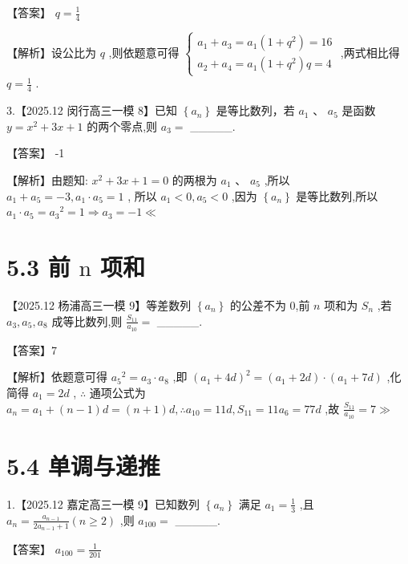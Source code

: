 \documentclass[10pt]{article}
\begin{document}
【答案】 \(q = \frac{1}{4}\)

【解析】设公比为 \(q\) ,则依题意可得 \(\left\{  \begin{array}{l} {a}_{1} + {a}_{3} = {a}_{1}\left( {1 + {q}^{2}}\right)  = {16} \\  {a}_{2} + {a}_{4} = {a}_{1}\left( {1 + {q}^{2}}\right) q = 4 \end{array}\right.\) ,两式相比得 \(q = \frac{1}{4}\) .

3.【2025.12 闵行高三一模 8】已知 \(\left\{  {a}_{n}\right\}\) 是等比数列，若 \({a}_{1}\) 、 \({a}_{5}\) 是函数 \(y = {x}^{2} + {3x} + 1\) 的两个零点,则 \({a}_{3} =\) \_\_\_\_\_.

【答案】 -1

【解析】由题知: \({x}^{2} + {3x} + 1 = 0\) 的两根为 \({a}_{1}\text{ 、 }{a}_{5}\) ,所以 \({a}_{1} + {a}_{5} =  - 3,{a}_{1} \cdot  {a}_{5} = 1\) , 所以 \({a}_{1} < 0,{a}_{5} < 0\) ,因为 \(\left\{  {a}_{n}\right\}\) 是等比数列,所以 \({a}_{1} \cdot  {a}_{5} = {a}_{3}{}^{2} = 1 \Rightarrow  {a}_{3} =  - 1 \ll\)

\section*{5.3 前 \(\mathrm{n}\) 项和}

【2025.12 杨浦高三一模 9】等差数列 \(\left\{  {a}_{n}\right\}\) 的公差不为 0,前 \(n\) 项和为 \({S}_{n}\) ,若 \({a}_{3},{a}_{5},{a}_{8}\) 成等比数列,则 \(\frac{{S}_{11}}{{a}_{10}} =\) \_\_\_\_\_.

【答案】7

【解析】依题意可得 \({a}_{5}{}^{2} = {a}_{3} \cdot  {a}_{8}\) ,即 \({\left( {a}_{1} + 4d\right) }^{2} = \left( {{a}_{1} + {2d}}\right)  \cdot  \left( {{a}_{1} + {7d}}\right)\) ,化简得 \({a}_{1} = {2d}\) , \(\therefore\) 通项公式为 \({a}_{n} = {a}_{1} + \left( {n - 1}\right) d = \left( {n + 1}\right) d,\therefore {a}_{10} = {11d},{S}_{11} = {11}{a}_{6} = {77d}\) ,故 \(\frac{{S}_{11}}{{a}_{10}} = 7 \gg\)

\section*{5.4 单调与递推}

1.【2025.12 嘉定高三一模 9】已知数列 \(\left\{  {a}_{n}\right\}\) 满足 \({a}_{1} = \frac{1}{3}\) ,且 \({a}_{n} = \frac{{a}_{n - 1}}{2{a}_{n - 1} + 1}\left( {n \geq  2}\right)\) ,则 \({a}_{100} =\) \_\_\_\_\_.

【答案】 \({a}_{100} = \frac{1}{201}\)
\end{document}
